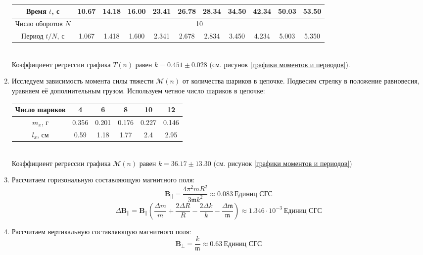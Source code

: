 \documentclass[a4paper, 12pt]{article}
\begin{document}
\begin{enumerate}
\begin{table}[htbp]
\begin{tabular}{|c|c|c|c|c|c|c|c|c|c|c|}
            Время $t$, с & 10.67 & 14.18 & 16.00 & 23.41 & 26.78 & 28.34 & 34.50 & 42.34 & 50.03 & 53.50\\ \hline
            Число оборотов $N$ & \multicolumn{10}{|c|}{10}\\ \hline
            Период $t/N$, с & 1.067 & 1.418 & 1.600 & 2.341 & 2.678 & 2.834 & 3.450 & 4.234 & 5.003 & 5.350\\ \hline
        \end{tabular}
    \end{table}\\
    Коэффициент регрессии графика $T(n)$ равен $k = 0.451\pm 0.028$ (см. рисунок \ref{графики моментов и периодов}).
    \item Исследуем зависимость момента силы тяжести $\mathcal{M}(n)$ от количества шариков в цепочке. Подвесим стрелку в положение равновесия, уравняем её дополнительным грузом. Используем четное число шариков в цепочке:
    \begin{table}[htbp]
        \centering
        \begin{tabular}{|c|c|c|c|c|c|}
            \hline
            Число шариков & 4 & 6 & 8 & 10 & 12\\ \hline
            $m_{x}$, г & 0.356 & 0.201 & 0.176 & 0.227 & 0.146\\ \hline
            $l_{x}$, см & 0.59 & 1.18 & 1.77 & 2.4 & 2.95\\ \hline
        \end{tabular}
    \end{table}\\
    Коэффициент регрессии графика $\mathcal{M}(n)$ равен $k = 36.17\pm 13.30$ (см. рисунок \ref{графики моментов и периодов})
    \item Рассчитаем горизональную составляющую магнитного поля:
    \begin{equation*}
        \mathbf{B_{||}} = \frac{4\pi^{2} mR^{2}}{3\mathfrak{m}k^{2}} \approx 0.083\ \text{Единиц СГС}
    \end{equation*}
    \begin{equation*}
        \Delta \mathbf{B_{||}} = \mathbf{B_{||}}\left(\frac{\Delta m}{m} + \frac{2\Delta R}{R} - \frac{2\Delta k}{k} - \frac{\Delta \mathfrak{m}}{\mathfrak{m}}\right) \approx 1.346 \cdot10^{-3}\ \text{Единиц СГС}
    \end{equation*}
    \item Рассчитаем вертикальную составляющую магнитного поля:
    \begin{equation*}
        \mathbf{B_{\perp}} = \frac{k}{\mathfrak{m}} \approx 0.63\ \text{Единиц СГС}

\end{equation*}
\end{enumerate}
\end{document}
